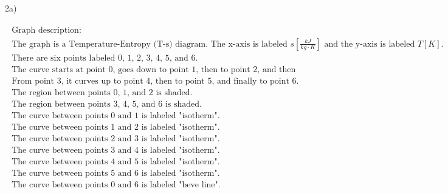 2a)

\[
\begin{array}{c}
\begin{array}{c}
\text{Graph description:} \\
\text{The graph is a Temperature-Entropy (T-s) diagram. The x-axis is labeled } s \left[ \frac{kJ}{kg \cdot K} \right] \text{ and the y-axis is labeled } T [K]. \\
\text{There are six points labeled 0, 1, 2, 3, 4, 5, and 6.} \\
\text{The curve starts at point 0, goes down to point 1, then to point 2, and then to point 3.} \\
\text{From point 3, it curves up to point 4, then to point 5, and finally to point 6.} \\
\text{The region between points 0, 1, and 2 is shaded.} \\
\text{The region between points 3, 4, 5, and 6 is shaded.} \\
\text{The curve between points 0 and 1 is labeled "isotherm".} \\
\text{The curve between points 1 and 2 is labeled "isotherm".} \\
\text{The curve between points 2 and 3 is labeled "isotherm".} \\
\text{The curve between points 3 and 4 is labeled "isotherm".} \\
\text{The curve between points 4 and 5 is labeled "isotherm".} \\
\text{The curve between points 5 and 6 is labeled "isotherm".} \\
\text{The curve between points 0 and 6 is labeled "beve line".} \\
\end{array}
\end{array}
\]